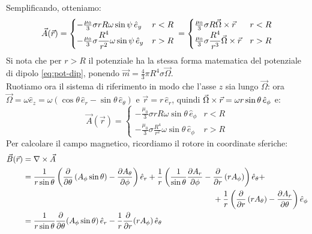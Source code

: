 Semplificando, otteniamo:
\begin{equation}
	\vec{A}(\vec{r}) =
	\begin{cases}
		-\frac{\mu_0}{3} \sigma r R \omega \sin\psi \,\hat{e}_y & r < R \\ 
		-\frac{\mu_0}{3} \sigma \displaystyle\frac{R^4}{r^2} \omega \sin\psi \,\hat{e}_y & r > R
	\end{cases}
	\,=
	\begin{cases}
		\frac{\mu_0}{3} \sigma R \vec{\Omega}\times\vec{r} & r < R \\ 
		\frac{\mu_0}{3} \sigma \displaystyle\frac{R^4}{r^3} \vec{\Omega}\times\vec{r} & r > R
	\end{cases}
	\label{eq:po-sf}
\end{equation}
Si nota che per $ r > R $ il potenziale ha la stessa forma matematica del potenziale di dipolo \ref{eq:pot-dip}, ponendo $ \vec{m} = \frac{4}{3} \pi R^4 \sigma\vec{\Omega} $. \\ 
%
Ruotiamo ora il sistema di riferimento in modo che l'asse $ z $ sia lungo $ \vec{\Omega} $: ora $ \vec{\Omega} = \omega \hat{e}_z = \omega (\cos\theta \,\hat{e}_r - \sin\theta \,\hat{e}_{\theta}) $ e $ \vec{r} = r \,\hat{e}_r $, quindi $ \vec{\Omega}\times\vec{r} = \omega r \sin\theta \,\hat{e}_{\phi} $ e:
\begin{equation}
	\vec{A}(\vec{r}) =
	\begin{cases}
		-\frac{\mu_0}{3} \sigma r R \omega \sin\theta \,\hat{e}_{\phi} & r < R \\ 
		-\frac{\mu_0}{3} \sigma \displaystyle\frac{R^4}{r^2} \omega \sin\theta \,\hat{e}_{\phi} & r > R
	\end{cases}
	\label{eq:}
\end{equation}
Per calcolare il campo magnetico, ricordiamo il rotore in coordinate sferiche:
\begin{equation}
	\begin{split}
		\vec{B}(\vec{r}) &= \nabla\times\vec{A} \\ 
				 &= \displaystyle\frac{1}{r\sin\theta} \left( \displaystyle\frac{\partial}{\partial\theta} \left( A_{\phi} \sin\theta \right) - \displaystyle\frac{\partial A_{\theta}}{\partial\phi} \right) \hat{e}_r + \displaystyle\frac{1}{r} \left( \displaystyle\frac{1}{\sin\theta} \displaystyle\frac{\partial A_r}{\partial\phi} - \displaystyle\frac{\partial}{\partial r} \left(r A_{\phi} \right)\right) \hat{e}_{\theta} + \\ 
				 & \qquad\qquad\qquad\qquad\qquad\qquad\qquad\qquad\qquad\qquad\qquad\qquad + \displaystyle\frac{1}{r} \left(\displaystyle\frac{\partial}{\partial r} \left( r A_{\theta} \right) - \displaystyle\frac{\partial A_r}{\partial\theta} \right) \hat{e}_{\phi} \\ 
				 &= \displaystyle\frac{1}{r\sin\theta}\displaystyle\frac{\partial}{\partial\theta}(A_{\phi} \sin\theta) \,\hat{e}_r - \displaystyle\frac{1}{r}\displaystyle\frac{\partial}{\partial r} (rA_{\phi}) \,\hat{e}_{\theta}
	\end{split}
	\label{eq:}
\end{equation}

